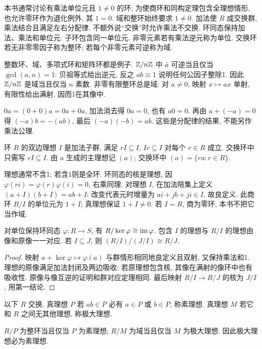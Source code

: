 \begin{definition}
本书通常讨论有乘法单位元且 $1\ne0$ 的环; 为使商环和同构定理包含全理想情形, 也允许零环作为退化例外, 其 $1=0$. 域和整环始终要求 $1\ne0$. 加法使 $R$ 成交换群, 乘法结合且满足左右分配律. 不额外说“交换”时允许乘法不交换. 环同态保持加法、乘法和单位元. 子环包含同一单位元. 非零元素若有乘法逆元称为单位. 交换环若无非零零因子称为整环; 若每个非零元素可逆称为域.
\end{definition}
整数环、域、多项式环和矩阵环都是例子. $\mathbb Z/n\mathbb Z$ 中 $\bar a$ 可逆当且仅当 $\gcd(a,n)=1$: 贝祖等式给出逆元, 反之 $ab\equiv1$ 说明任何公因子整除1. 因此 $\mathbb Z/n\mathbb Z$ 是域当且仅当 $n$ 素数. 非零有限整环总是域: 对 $a\ne0$, 映射 $x\mapsto ax$ 单射, 有限性给出满射, 因而1在其像中.

$0a=(0+0)a=0a+0a$, 加法消去得 $0a=0$, 也有 $a0=0$. 再由 $a+(-a)=0$ 得 $(-a)b=-(ab)$, 最后 $(-a)(-b)=ab$. 这些是分配律的结果, 不能另作乘法公理.
\begin{definition}
环 $R$ 的双边理想 $I$ 是加法子群, 满足 $rI\subseteq I$, $Ir\subseteq I$ 对每个 $r\in R$ 成立. 交换环中只需写 $rI\subseteq I$. 由 $a$ 生成的主理想记 $(a)$; 交换环中 $(a)=\{ra:r\in R\}$.
\end{definition}
理想通常不含1; 若含1则是全环. 环同态的核是理想, 因 $\varphi(ri)=\varphi(r)\varphi(i)=0$, 右乘同理. 对理想 $I$, 在加法陪集上定义 $(a+I)(b+I)=ab+I$: 改变代表元时增量为 $ai+jb+ji\in I$, 故良定义. 此商环 $R/I$ 的单位元为 $1+I$; 真理想保证 $1+I\ne0$. 若 $I=R$, 商为零环, 本书不把它当作域.
\begin{theorem}
对单位保持环同态 $\varphi:R\to S$, 有 $R/\ker\varphi\cong\operatorname{im}\varphi$. 包含 $I$ 的理想与 $R/I$ 的理想由像和原像一一对应. 若 $I\subseteq J$, 则 $(R/I)/(J/I)\cong R/J$.
\end{theorem}
\begin{proof}
映射 $a+\ker\varphi\mapsto\varphi(a)$ 与群情形相同地良定义且双射, 又保持乘法和1. 理想的原像满足加法封闭及两边吸收; 若原理想包含核, 其像在满射的像环中也有吸收性. 原像与像互逆的证明和群对应定理相同. 最后映射 $R/I\to R/J$ 的核为 $J/I$, 用第一结论.
\end{proof}
\begin{definition}
以下 $R$ 交换. 真理想 $P$ 若 $ab\in P$ 必有 $a\in P$ 或 $b\in P$, 称素理想. 真理想 $M$ 若它和 $R$ 之间无其他理想, 称极大理想.
\end{definition}
\begin{theorem}\label{thm:maximal}
$R/P$ 为整环当且仅当 $P$ 为素理想; $R/M$ 为域当且仅当 $M$ 为极大理想. 因此极大理想必为素理想.
\end{theorem}
